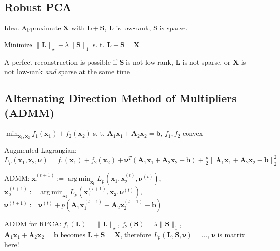 \documentclass[a4paper, 11pt, landscape]{article}
\DeclareMathOperator*{\argmin}{arg\,min}
\begin{document}
\begin{multicols*}{3}
\section{Robust PCA}
\begin{compactitem}
	\item Idea: Approximate $\mathbf{X}$ with $\mathbf{L} + \mathbf{S}$, $\mathbf{L}$ is low-rank, $\mathbf{S}$ is sparse.
	\item Minimize $\|\mathbf{L}\|_\star + \lambda \|\mathbf{S}\|_1$ s. t. $\mathbf{L} + \mathbf{S} = \mathbf{X}$
	\item A perfect reconstruction is possible if $\mathbf{S}$ is not low-rank, $\mathbf{L}$ is not sparse, or $\mathbf{X}$ is not low-rank \textit{and} sparse at the same time
\end{compactitem}

\subsection{Alternating Direction Method of Multipliers (ADMM)}
$\min_{\mathbf{x}_1, \mathbf{x}_2} f_1(\mathbf{x}_1) + f_2(\mathbf{x}_2)$ s. t. $\mathbf{A}_1 \mathbf{x}_1 + \mathbf{A}_2 \mathbf{x}_2 = \mathbf{b}$, $f_1, f_2$ convex
\begin{inparaitem}[\color{red}\textbullet]
	\item Augmented Lagrangian: $L_p(\mathbf{x}_1, \mathbf{x}_2, \boldsymbol{\nu}) = f_1(\mathbf{x}_1) + f_2(\mathbf{x}_2) + \boldsymbol{\nu}^T (\mathbf{A}_1 \mathbf{x}_1 + \mathbf{A}_2 \mathbf{x}_2 - \mathbf{b}) + \frac{p}{2}\| \mathbf{A}_1 \mathbf{x}_1 + \mathbf{A}_2 \mathbf{x}_2 - \mathbf{b} \|_2^2$
	\item ADMM: $\mathbf{x}_1^{(t+1)} := \argmin_{\mathbf{x}_1} L_p(\mathbf{x}_1, \mathbf{x}_2^{(t)}, \boldsymbol{\nu}^{(t)})$, $\mathbf{x}_2^{(t+1)} := \argmin_{\mathbf{x}_2} L_p(\mathbf{x}_1^{(t+1)}, \mathbf{x}_2, \boldsymbol{\nu}^{(t)})$, $\boldsymbol{\nu}^{(t+1)} := \boldsymbol{\nu}^{(t)} + p(\mathbf{A}_1 \mathbf{x}_1^{(t+1)} + \mathbf{A}_2 \mathbf{x}_2^{(t+1)} - \mathbf{b})$
	\item ADDM for RPCA: $f_1(\mathbf{L}) = \|\mathbf{L}\|_\star$, $f_2(\mathbf{S}) = \lambda \| \mathbf{S} \|_1$, $\mathbf{A}_1 \mathbf{x}_1 + \mathbf{A}_2 \mathbf{x}_2 = \mathbf{b} \text{ becomes } \mathbf{L} + \mathbf{S} = \mathbf{X}$, therefore $L_p(\mathbf{L}, \mathbf{S}, \boldsymbol{\nu}) = \ldots$, $\boldsymbol{\nu}$ is matrix here!
\end{inparaitem}



\end{multicols*}
\end{document}
